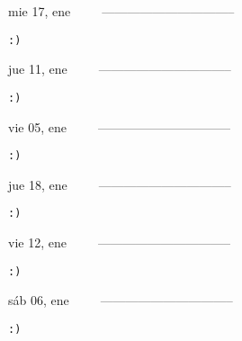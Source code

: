 \documentclass[letterpaper,10pt]{article}
\begin{document}
\begin{multicols}{3}
{mie 17, ene\ \ \ \ \ --------------------------------}
\begin{flushright}\begin{small}\texttt{:)}\end{small}\end{flushright}
\vfill
{jue 11, ene\ \ \ \ \ --------------------------------}
\begin{flushright}\begin{small}\texttt{:)}\end{small}\end{flushright}\par
\vfill
{vie 05, ene\ \ \ \ \ --------------------------------}
\begin{flushright}\begin{small}\texttt{:)}\end{small}\end{flushright}\par
\vfill
\end{multicols}
\vspace{1.05cm}

\begin{multicols}{3}
{jue 18, ene\ \ \ \ \ --------------------------------}
\begin{flushright}\begin{small}\texttt{:)}\end{small}\end{flushright}
\vfill
{vie 12, ene\ \ \ \ \ --------------------------------}
\begin{flushright}\begin{small}\texttt{:)}\end{small}\end{flushright}\par
\vfill
{sáb 06, ene\ \ \ \ \ --------------------------------}
\begin{flushright}\begin{small}\texttt{:)}\end{small}\end{flushright}\par
\vfill
\end{multicols}
\vspace{1.05cm}
\end{document}
